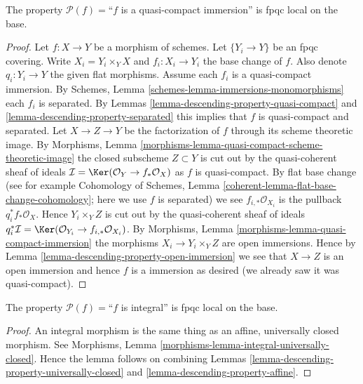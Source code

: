 \begin{lemma}
\label{lemma-descending-property-quasi-compact-immersion}
The property $\mathcal{P}(f) =$``$f$ is a quasi-compact immersion''
is fpqc local on the base.
\end{lemma}

\begin{proof}
Let $f : X \to Y$ be a morphism of schemes.
Let $\{Y_i \to Y\}$ be an fpqc covering.
Write $X_i = Y_i \times_Y X$ and $f_i : X_i \to Y_i$
the base change of $f$. Also denote
$q_i : Y_i \to Y$ the given flat morphisms.
Assume each $f_i$ is a quasi-compact immersion.
By Schemes, Lemma \ref{schemes-lemma-immersions-monomorphisms}
each $f_i$ is separated.
By Lemmas \ref{lemma-descending-property-quasi-compact} and
\ref{lemma-descending-property-separated}
this implies that $f$ is quasi-compact and separated.
Let $X \to Z \to Y$ be the factorization of $f$ through its
scheme theoretic image. By
Morphisms, Lemma \ref{morphisms-lemma-quasi-compact-scheme-theoretic-image}
the closed subscheme $Z \subset Y$ is cut out by the
quasi-coherent sheaf of ideals
$\mathcal{I} = \Ker(\mathcal{O}_Y \to f_*\mathcal{O}_X)$
as $f$ is quasi-compact. By flat base change
(see for example
Cohomology of Schemes, Lemma \ref{coherent-lemma-flat-base-change-cohomology};
here we use $f$ is separated)
we see $f_{i, *}\mathcal{O}_{X_i}$ is the pullback $q_i^*f_*\mathcal{O}_X$.
Hence $Y_i \times_Y Z$ is cut out by the
quasi-coherent sheaf of ideals $q_i^*\mathcal{I} =
\Ker(\mathcal{O}_{Y_i} \to f_{i, *}\mathcal{O}_{X_i})$.
By Morphisms, Lemma \ref{morphisms-lemma-quasi-compact-immersion}
the morphisms $X_i \to Y_i \times_Y Z$
are open immersions. Hence by
Lemma \ref{lemma-descending-property-open-immersion}
we see that $X \to Z$ is an open immersion and
hence $f$ is a immersion as desired
(we already saw it was quasi-compact).
\end{proof}

\begin{lemma}
\label{lemma-descending-property-integral}
The property $\mathcal{P}(f) =$``$f$ is integral''
is fpqc local on the base.
\end{lemma}

\begin{proof}
An integral morphism is the same thing as an affine,
universally closed morphism. See
Morphisms, Lemma \ref{morphisms-lemma-integral-universally-closed}.
Hence the lemma follows on combining
Lemmas \ref{lemma-descending-property-universally-closed}
and \ref{lemma-descending-property-affine}.
\end{proof}

